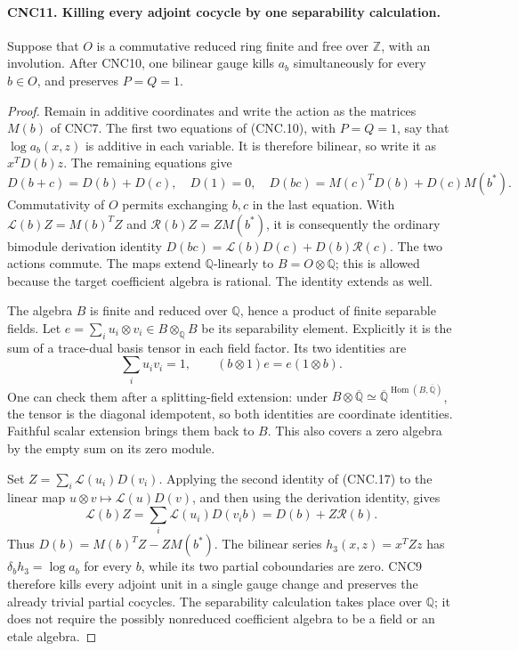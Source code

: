 \paragraph{CNC11. Killing every adjoint cocycle by one separability calculation.}
\label{claim:CNC11}
Suppose that \(O\) is a commutative reduced ring finite and free over
\(\mathbb Z\), with an involution.  After CNC10, one bilinear gauge
kills \(a_b\) simultaneously for every \(b\in O\), and preserves
\(P=Q=1\).
\begin{proof}
Remain in additive coordinates and write the action as the matrices
\(M(b)\) of CNC7.  The first two equations of (CNC.10), with
\(P=Q=1\), say that \(\log a_b(x,z)\) is additive in each
variable.  It is therefore bilinear, so write it as \(x^TD(b)z\).
The remaining equations give
\[
 D(b+c)=D(b)+D(c),\quad D(1)=0,\quad
 D(bc)=M(c)^TD(b)+D(c)M(b^*).                                 \tag{CNC.16}
\]
Commutativity of \(O\) permits exchanging \(b,c\) in the last
equation.  With
\(\mathcal L(b)Z=M(b)^TZ\) and
\(\mathcal R(b)Z=ZM(b^*)\), it is consequently the ordinary
bimodule derivation identity
\(D(bc)=\mathcal L(b)D(c)+D(b)\mathcal R(c)\).
The two actions commute.  The maps extend \(\mathbb Q\)-linearly
to \(B=O\otimes\mathbb Q\); this is allowed because the target
coefficient algebra is rational.  The identity extends as well.

The algebra \(B\) is finite and reduced over \(\mathbb Q\), hence
a product of finite separable fields.  Let
\(e=\sum_i u_i\otimes v_i\in B\otimes_{\mathbb Q}B\)
be its separability element.  Explicitly it is the sum of a trace-dual
basis tensor in each field factor.  Its two identities are
\[
 \sum_i u_iv_i=1,\qquad
 (b\otimes1)e=e(1\otimes b).                                 \tag{CNC.17}
\]
One can check them after a splitting-field extension: under
\(B\otimes\overline{\mathbb Q}\simeq
\overline{\mathbb Q}^{\operatorname{Hom}(B,\overline{\mathbb Q})}\),
the tensor is the diagonal idempotent, so both identities are coordinate
identities.  Faithful scalar extension brings them back to \(B\).
This also covers a zero algebra by the empty sum on its zero module.

Set \(Z=\sum_i\mathcal L(u_i)D(v_i)\).  Applying the second
identity of (CNC.17) to the linear map
\(u\otimes v\mapsto\mathcal L(u)D(v)\), and then using the
derivation identity, gives
\[
 \mathcal L(b)Z
 =\sum_i\mathcal L(u_i)D(v_ib)
 =D(b)+Z\mathcal R(b).
\]
Thus \(D(b)=M(b)^TZ-ZM(b^*)\).
The bilinear series \(h_3(x,z)=x^TZz\) has
\(\delta_bh_3=\log a_b\) for every \(b\), while its two
partial coboundaries are zero.  CNC9 therefore kills every adjoint
unit in a single gauge change and preserves the already trivial
partial cocycles.  The separability calculation takes place over
\(\mathbb Q\); it does not require the possibly nonreduced
coefficient algebra to be a field or an etale algebra.
\end{proof}

